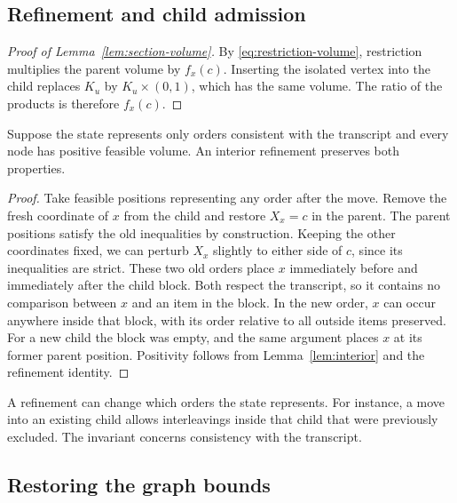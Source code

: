 \subsection{Refinement and child admission}

\begin{proof}[Proof of Lemma~\ref{lem:section-volume}]
By \eqref{eq:restriction-volume}, restriction multiplies the parent
volume by $f_x(c)$. Inserting the isolated vertex into the child replaces
$K_u$ by $K_u\times(0,1)$, which has the same volume. The ratio of the
products is therefore $f_x(c)$.
\end{proof}

\begin{lemma}\label{lem:admission}
Suppose the state represents only orders consistent with the transcript
and every node has positive feasible volume. An interior refinement
preserves both properties.
\end{lemma}
\begin{proof}
Take feasible positions representing any order after the move. Remove
the fresh coordinate of $x$ from the child and restore $X_x=c$ in the
parent. The parent positions satisfy the old inequalities by construction.
Keeping the other coordinates fixed, we can perturb $X_x$ slightly to
either side of $c$, since its inequalities are strict. These two old
orders place $x$ immediately before and immediately after the child
block. Both respect the transcript, so it contains no comparison between
$x$ and an item in the block. In the new order, $x$ can occur anywhere
inside that block, with its order relative to all outside items preserved.
For a new child the block was empty, and the same argument places $x$
at its former parent position. Positivity follows from
Lemma~\ref{lem:interior} and the refinement identity.
\end{proof}


A refinement can change which orders the state represents. For instance,
a move into an existing child allows interleavings inside that child
that were previously excluded. The invariant concerns consistency with
the transcript.

\subsection{Restoring the graph bounds}

